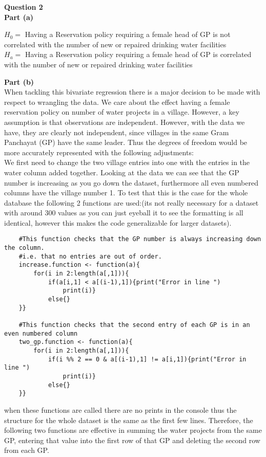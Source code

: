 \documentclass{article}
\begin{document}
\textbf{\Large Question 2\\}
\textbf{\large Part (a)\\}
\begin{center}
	$H_0 =$ Having a Reservation policy requiring a female head of GP is not correlated with the number of new or repaired drinking water facilities\\
	$H_a =$ Having a Reservation policy requiring a female head of GP is correlated with the number of new or repaired drinking water facilities\\
\end{center}
\pagebreak
\textbf{\large Part (b)\\}
When tackling this bivariate regression there is a major decision to be made with respect to wrangling the data. We care about the effect having a female reservation policy on number of water projects in a village. However, a key assumption is that observations are independent. However, with the data we have, they are clearly not independent, since villages in the same Gram Panchayat (GP) have the same leader. Thus the degrees of freedom would be more accurately represented with the following adjustments:\\
We first need to change the two village entries into one with the entries in the water column added together. Looking at the data we can see that the GP number is increasing as you go down the dataset, furthermore all even numbered columns have the village number 1. To test that this is the case for the whole database the following 2 functions are used:(its not really necessary for a dataset with around 300 values as you can just eyeball it to see the formatting is all identical, however this makes the code generalizable for larger datasets).
\begin{verbatim}
	#This function checks that the GP number is always increasing down the column. 
	#i.e. that no entries are out of order.
	increase.function <- function(a){
	    for(i in 2:length(a[,1])){
	        if(a[i,1] < a[(i-1),1]){print("Error in line ")
	            print(i)}
	        else{}
	}}
	
	#This function checks that the second entry of each GP is in an even numbered column
	two_gp.function <- function(a){
	    for(i in 2:length(a[,1])){
	        if(i %% 2 == 0 & a[(i-1),1] != a[i,1]){print("Error in line ")
	            print(i)}
	        else{}
	}}
\end{verbatim}
when these functions are called there are no prints in the console thus the structure for the whole dataset is the same as the first few lines. Therefore, the following two functions are effective in summing the water projects from the same GP, entering that value into the first row of that GP and deleting the second row from each GP.
\end{document}
